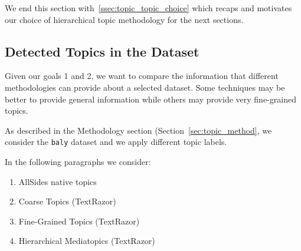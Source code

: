 We end this section with~\ref{ssec:topic_topic_choice} which recaps and motivates our choice of hierarchical topic methodology for the next sections.



\subsection{\statusgreen Detected Topics in the Dataset}
\label{ssec:topic_topic_granularities_alone}





Given our goals 1 and 2, we want to compare the information that different methodologies can provide about a selected dataset. Some techniques may be better to provide general information while others may provide very fine-grained topics.

As described in the Methodology section (Section~\ref{sec:topic_method}, we consider the \texttt{baly} dataset and we apply different topic labels.

In the following paragraphs we consider:

\begin{enumerate}
    \item AllSides native topics
    \item Coarse Topics (TextRazor)
    \item Fine-Grained Topics (TextRazor)
    \item Hierarchical Mediatopics (TextRazor)
\end{enumerate}

